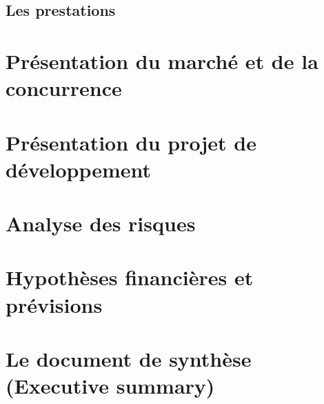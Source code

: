 \documentclass[a4paper,12pt]{report}
\begin{document}
\subsection{Les prestations}

\section{Présentation du marché et de la concurrence}
\section{Présentation du projet de développement}
\section{Analyse des risques}
\section{Hypothèses financières et prévisions}
\section{Le document de synthèse (Executive summary)}
\end{document}
